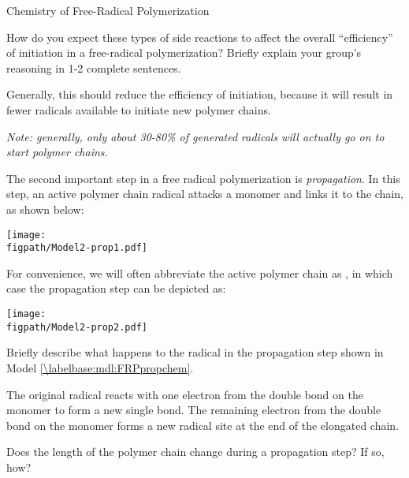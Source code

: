 \begin{activity}{Chemistry of Free-Radical Polymerization}
\begin{ctqs}
				How do you expect these types of side reactions to affect the overall ``efficiency'' of initiation in a free-radical polymerization? Briefly explain your group's reasoning in 1-2 complete sentences.
	
				\begin{solution}[1.5in]{}
					Generally, this should reduce the efficiency of initiation, because it will result in fewer radicals available to initiate new polymer chains.
					
					\emph{Note: generally, only about 30-80\% of generated radicals will actually go on to start polymer chains.}
				\end{solution}

\end{ctqs}



\begin{model}[Propagation]
\label{\labelbase:mdl:FRPpropchem}

	The second important step in a free radical polymerization is \emph{propagation}.  In this step, an active polymer chain radical attacks a monomer and links it to the chain, as shown below:
	
			\centerline{\texttt{[image: \\figpath/Model2-prop1.pdf]}}
	
	For convenience, we will often abbreviate the active polymer chain as , in which case the propagation step can be depicted as:
	
			\centerline{\texttt{[image: \\figpath/Model2-prop2.pdf]}}
	

\end{model}

\begin{ctqs}

	\question Briefly describe what happens to the radical in the propagation step shown in Model \ref{\labelbase:mdl:FRPpropchem}.%
	
		\begin{solution}[1.5in]{}
			The original radical reacts with one electron from the double bond on the monomer to form a new single bond.  The remaining electron from the double bond on the monomer forms a new radical site at the end of the elongated chain.
		\end{solution}
	
	\question Does the length of the polymer chain change during a propagation step?  If so, how?
	

\end{ctqs}
\end{activity}
